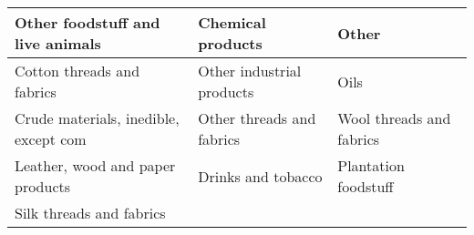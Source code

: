 \begin{tabular}{|l|l|l|}
\hline
Other foodstuff and live animals      & Chemical products         & Other                    \\ \hline
Cotton threads and fabrics            & Other industrial products & Oils                     \\ \hline
Crude materials, inedible, except com & Other threads and fabrics & Wool threads and fabrics \\ \hline
Leather, wood and paper products      & Drinks and tobacco        & Plantation foodstuff     \\ \hline
Silk threads and fabrics              &                           &                          \\ \hline
\end{tabular}
